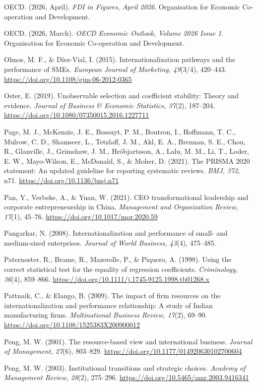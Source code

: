 \documentclass[
  a4paper,
  13pt]{extreport}
\begin{document}
OECD. (2026, April). \emph{FDI in Figures, April 2026}. Organisation for
Economic Co-operation and Development.

OECD. (2026, March). \emph{OECD Economic Outlook, Volume 2026 Issue 1}.
Organisation for Economic Co-operation and Development.

Olmos, M. F., \& Díez-Vial, I. (2015). Internationalization pathways and
the performance of SMEs. \emph{European Journal of Marketing, 49}(3/4),
420--443. \url{https://doi.org/10.1108/ejm-06-2012-0365}

Oster, E. (2019). Unobservable selection and coefficient stability:
Theory and evidence. \emph{Journal of Business \& Economic Statistics,
37}(2), 187--204. \url{https://doi.org/10.1080/07350015.2016.1227711}

Page, M. J., McKenzie, J. E., Bossuyt, P. M., Boutron, I., Hoffmann, T.
C., Mulrow, C. D., Shamseer, L., Tetzlaff, J. M., Akl, E. A., Brennan,
S. E., Chou, R., Glanville, J., Grimshaw, J. M., Hróbjartsson, A., Lalu,
M. M., Li, T., Loder, E. W., Mayo-Wilson, E., McDonald, S., \& Moher, D.
(2021). The PRISMA 2020 statement: An updated guideline for reporting
systematic reviews. \emph{BMJ, 372}, n71.
\url{https://doi.org/10.1136/bmj.n71}

Pan, Y., Verbeke, A., \& Yuan, W. (2021). CEO transformational
leadership and corporate entrepreneurship in China. \emph{Management and
Organization Review, 17}(1), 45--76.
\url{https://doi.org/10.1017/mor.2020.59}

Pangarkar, N. (2008). Internationalization and performance of small- and
medium-sized enterprises. \emph{Journal of World Business, 43}(4),
475--485.

Paternoster, R., Brame, R., Mazerolle, P., \& Piquero, A. (1998). Using
the correct statistical test for the equality of regression
coefficients. \emph{Criminology, 36}(4), 859--866.
\url{https://doi.org/10.1111/j.1745-9125.1998.tb01268.x}

Pattnaik, C., \& Elango, B. (2009). The impact of firm resources on the
internationalization and performance relationship: A study of Indian
manufacturing firms. \emph{Multinational Business Review, 17}(2),
69--90. \url{https://doi.org/10.1108/1525383X200900012}

Peng, M. W. (2001). The resource-based view and international business.
\emph{Journal of Management, 27}(6), 803--829.
\url{https://doi.org/10.1177/014920630102700604}

Peng, M. W. (2003). Institutional transitions and strategic choices.
\emph{Academy of Management Review, 28}(2), 275--296.
\url{https://doi.org/10.5465/amr.2003.9416341}
\end{document}
